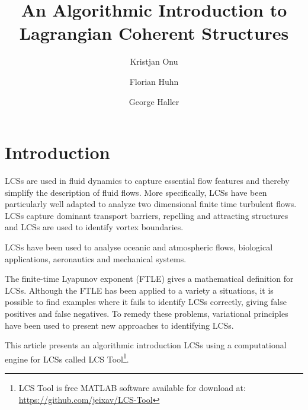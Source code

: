 \documentclass{article}
\title{An Algorithmic Introduction to Lagrangian Coherent Structures}
\author{Kristjan Onu \and Florian Huhn \and George Haller}
\begin{document}

\maketitle

\tableofcontents


\section{Introduction}

LCSs are used in fluid dynamics to capture essential flow features and thereby simplify the description of fluid flows. More specifically, LCSs have been particularly well adapted to analyze two dimensional finite time turbulent flows. LCSs capture dominant transport barriers, repelling and attracting structures and LCSs are used to identify vortex boundaries.

LCSs have been used to analyse oceanic and atmospheric flows, biological applications\parencite{wilson09:_lagran_reynol,tallapragada11:_lagran}, aeronautics\parencite{tang10:_accur_lagran_hong_kong_inter_airpor} and mechanical systems\parencite{hadjighasem13:_detec_kam}.

The finite-time Lyapunov exponent (FTLE) gives a mathematical definition for LCSs. Although the FTLE has been applied to a variety a situations, it is possible to find examples where it fails to identify LCSs correctly, giving false positives and false negatives\parencite{haller11:_lagran_coher_struc,norgard12:_secon_lagran_coher_struc}. To remedy these problems, variational principles have been used to present new approaches to identifying LCSs\parencite{haller11:_lagran_coher_struc,farazmand12:_comput_lagran,haller12:_geodes_theor_trans_barrier_two_dimen_flows,farazmand13:_attrac_lagran,haller13:_coher_lagran}.

This article presents an algorithmic introduction LCSs using a computational engine for LCSs called LCS Tool\footnote{LCS Tool is free MATLAB software available for download at: \url{https://github.com/jeixav/LCS-Tool}}.
\end{document}
